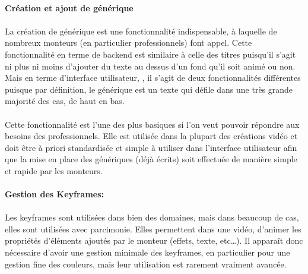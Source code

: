 \paragraph{Création et ajout de générique}

\paragraph{}

La création de générique est une fonctionnalité indispensable,
à laquelle de nombreux monteurs (en particulier professionnels)
font appel. Cette fonctionnalité en terme de backend est similaire à
celle des titres puisqu'il s'agit ni plus ni moins d'ajouter du texte
au dessus d'un fond qu'il soit animé ou non. Mais en terme d'interface
utilisateur, , il s'agit
de deux fonctionnalités différentes puisque par définition, le
générique est un texte qui défile dans une très grande majorité
des cas, de haut en bas.

\paragraph{}

Cette fonctionnalité est l'une des plus basiques si l'on veut pouvoir
répondre aux besoins des professionnels. Elle est utilisée dans la
plupart des créations vidéo et doit être à priori standardisée et
simple à utiliser dans l'interface utilisateur afin que la mise en place
des génériques (déjà écrits) soit effectuée de manière simple et
rapide par les monteurs.

\paragraph{Gestion des Keyframes:}

\paragraph{}

Les keyframes sont utilisées dans bien des domaines, mais dans beaucoup
de cas, elles sont utilisées avec parcimonie. Elles permettent dans une
vidéo, d'animer les propriétés d'éléments ajoutés par le monteur
(effets, texte, etc\ldots). Il apparaît donc nécessaire d'avoir une
gestion minimale des keyframes, en particulier pour une gestion fine
des couleurs, mais leur utilisation est rarement vraiment avancée.

